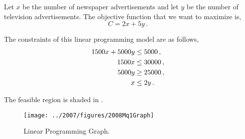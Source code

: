 %
%

\begin{subquestions}
	

\subquestion

Let $x$ be the number of newspaper advertisements and let $y$ be the number of television advertisements.	
The objective function that we want to maximize is,
\begin{equation}
	C =2x+5y \,.
\end{equation} 

The constraints of this linear programming model are as follows,
\begin{align}
	1500x + 5000y & \leq 5000 \,, \nonumber \\
	1500x & \leq 30000 \,, \nonumber \\
	5000y & \geq 25000 \,, \nonumber \\
	x & \leq 2y \,.
\end{align}


\subquestion

\begin{subsubquestions}

	
\subsubquestion

The feasible region is shaded in .
\begin{figure}
	\begin{center}
		\texttt{[image: ../2007/figures/2008Mq1Graph]}
		\caption{\label{2008M:q1:fig:Graph} Linear Programming Graph.}
	\end{center}
\end{figure}


\end{subsubquestions}
\end{subquestions}
